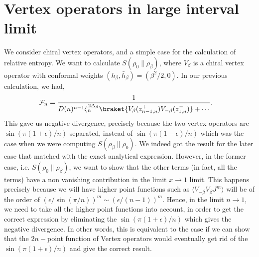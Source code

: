 \documentclass[11pt]{article}
\newcommand{\ep}{\epsilon}
\begin{document}
\section{Vertex operators in large interval limit}\label{Vertex operators Replica in large interval limit}
We consider chiral vertex operators, and a simple case for the calculation of relative entropy. We want to calculate $S(\rho_0 \| \rho_\beta)$, where $V_\beta$ is a chiral vertex operator with conformal weights $(h_\beta , \bar h_\beta ) = (\beta^2/2,0)$. In our previous calculation, we had,
\begin{align}
    \mathcal{F}_n &= \frac{1}{D(n)^{n-1} \zeta_n^{2\Delta_\beta}\braket{V_{\beta}(z_{n-1,n}^+)V_{-\beta}(z_{1,n}^-)}+\cdots}. 
\end{align}
This gave us negative divergence, precisely because the two vertex operators are $\sin(\pi (1+\ep)/n)$ separated, instead of $\sin(\pi(1-\ep)/n)$ which was the case when we were computing $S(\rho_\beta\| \rho_0)$. We indeed got the result for the later case that matched with the exact analytical expression.
However, in the former case, i.e. $S(\rho_0 \| \rho_\beta)$, we want to show that the other terms (in fact, all the terms) have a non vanishing contribution in the limit $x\to 1$ limit. This happens precisely because we will have higher point functions such as $\langle V_{-\beta}V_\beta J^m\rangle$ will be of the order of $(\ep/ \sin(\pi/n) )^m \sim (\ep /(n-1))^m$. Hence, in the limit $n\to 1$, we need to take all the higher point functions into account, in order to get the correct expression by eliminating the $\sin (\pi(1+\ep)/n)$ which gives the negative divergence. 
In other words, this is equivalent to the case if we can show that the $2n-$point function of Vertex operators would eventually get rid of the $\sin (\pi(1+\ep)/n)$  and give the correct result. 
\end{document}
